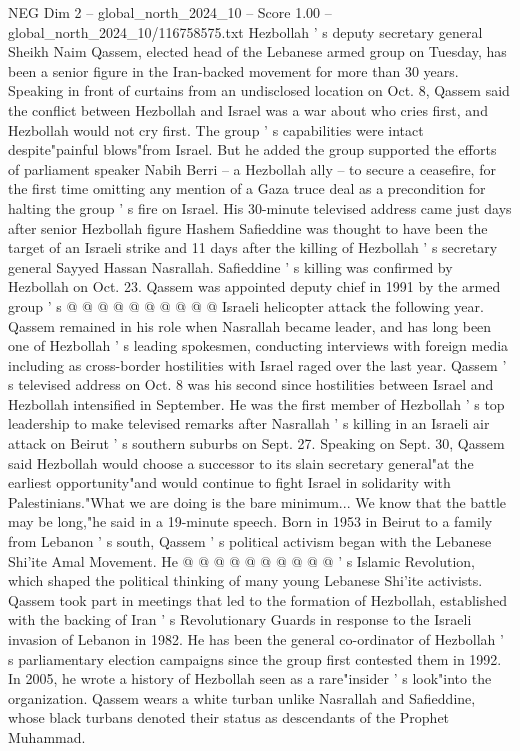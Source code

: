\begin{textsample}{NEG Dim 2 – global\_north\_2024\_10 – Score 1.00 – global\_north\_2024\_10/116758575.txt}  \label{ex:f2_neg_103}
Hezbollah ' s deputy secretary general Sheikh Naim Qassem, elected head of the Lebanese armed group on Tuesday, has been a senior figure in the Iran-backed movement for more than 30 years.
Speaking in front of curtains from an undisclosed location on Oct. 8, Qassem said the conflict between Hezbollah and Israel was a war about who cries first, and Hezbollah would not cry first.
The group ' s capabilities were intact despite"painful blows"from Israel.
But he added the group supported the efforts of parliament speaker Nabih Berri -- a Hezbollah ally -- to secure a ceasefire, for the first time omitting any mention of a Gaza truce deal as a precondition for halting the group ' s fire on Israel.
His 30-minute televised address came just days after senior Hezbollah figure Hashem Safieddine was thought to have been the target of an Israeli strike and 11 days after the killing of Hezbollah ' s secretary general Sayyed Hassan Nasrallah.
Safieddine ' s killing was confirmed by Hezbollah on Oct. 23.
Qassem was appointed deputy chief in 1991 by the armed group ' s @ @ @ @ @ @ @ @ @ @ Israeli helicopter attack the following year.
Qassem remained in his role when Nasrallah became leader, and has long been one of Hezbollah ' s leading spokesmen, conducting interviews with foreign media including as cross-border hostilities with Israel raged over the last year.
Qassem ' s televised address on Oct. 8 was his second since hostilities between Israel and Hezbollah intensified in September.
He was the first member of Hezbollah ' s top leadership to make televised remarks after Nasrallah ' s killing in an Israeli air attack on Beirut ' s southern suburbs on Sept. 27.
Speaking on Sept. 30, Qassem said Hezbollah would choose a successor to its slain secretary general"at the earliest opportunity"and would continue to fight Israel in solidarity with Palestinians."What we are doing is the bare minimum...
We know that the battle may be long,"he said in a 19-minute speech.
Born in 1953 in Beirut to a family from Lebanon ' s south, Qassem ' s political activism began with the Lebanese Shi'ite Amal Movement.
He @ @ @ @ @ @ @ @ @ @ ' s Islamic Revolution, which shaped the political thinking of many young Lebanese Shi'ite activists.
Qassem took part in meetings that led to the formation of Hezbollah, established with the backing of Iran ' s Revolutionary Guards in response to the Israeli invasion of Lebanon in 1982.
He has been the general co-ordinator of Hezbollah ' s parliamentary election campaigns since the group first contested them in 1992.
In 2005, he wrote a history of Hezbollah seen as a rare"insider ' s look"into the organization.
Qassem wears a white turban unlike Nasrallah and Safieddine, whose black turbans denoted their status as descendants of the Prophet Muhammad.

\end{textsample}
